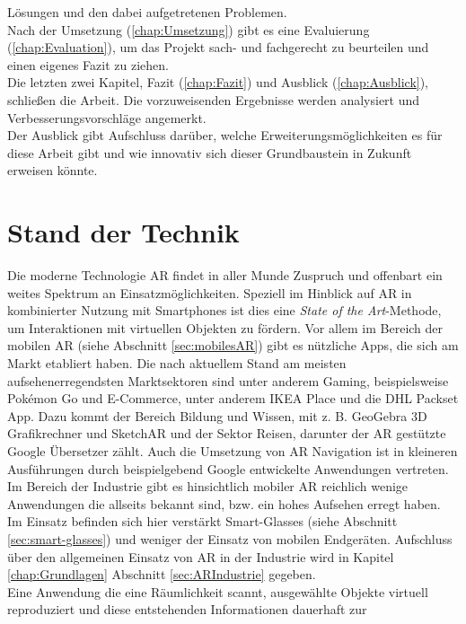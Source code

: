 Lösungen und den dabei aufgetretenen Problemen.
\\ 
Nach der Umsetzung (\ref{chap:Umsetzung}) gibt es eine Evaluierung (\ref{chap:Evaluation}), um das Projekt sach- und fachgerecht zu beurteilen 
und einen eigenes Fazit zu ziehen.
\\ 
Die letzten zwei Kapitel, Fazit (\ref{chap:Fazit}) und Ausblick (\ref{chap:Ausblick}), %
schließen die Arbeit. Die vorzuweisenden Ergebnisse werden analysiert und Verbesserungsvorschläge angemerkt.
\\ 
Der Ausblick gibt Aufschluss darüber, welche Erweiterungsmöglichkeiten es für diese Arbeit gibt und wie innovativ sich dieser 
Grundbaustein in Zukunft erweisen könnte. 
\section{Stand der Technik}
\label{chap:Stand der Technik}
Die moderne Technologie \acl{AR} findet in aller Munde Zuspruch und offenbart ein weites Spektrum an Einsatzmöglichkeiten. 
Speziell im Hinblick auf \acl{AR} in kombinierter Nutzung mit Smartphones ist dies eine \textit{State of the Art}-Methode, 
um Interaktionen mit virtuellen Objekten zu fördern. Vor allem im Bereich der mobilen \acs{AR} (siehe Abschnitt \ref{sec:mobilesAR}) 
gibt es nützliche Apps, die sich am Markt etabliert haben. Die nach aktuellem Stand am meisten aufsehenerregendsten Marktsektoren sind unter anderem 
Gaming, beispielsweise Pokémon Go und E-Commerce, unter anderem IKEA Place und die DHL Packset App. Dazu kommt der Bereich Bildung und Wissen, mit z. B. GeoGebra 3D 
Grafikrechner und SketchAR und der Sektor Reisen, darunter der \acs{AR} gestützte Google Übersetzer zählt. Auch die Umsetzung von \acl{AR} 
Navigation ist in kleineren Ausführungen durch beispielgebend Google entwickelte Anwendungen vertreten. %
\\ 
Im Bereich der Industrie gibt es hinsichtlich mobiler \acs{AR} 
reichlich wenige Anwendungen die allseits bekannt sind, bzw. ein hohes Aufsehen erregt haben. Im Einsatz befinden sich hier verstärkt Smart-Glasses (siehe Abschnitt 
\ref{sec:smart-glasses}) und weniger der Einsatz von mobilen Endgeräten. Aufschluss über den allgemeinen Einsatz von \acs{AR} in der Industrie wird in Kapitel 
\ref{chap:Grundlagen} Abschnitt \ref{sec:ARIndustrie} gegeben. 
\\ 
\linebreak
Eine Anwendung die eine Räumlichkeit scannt, ausgewählte Objekte virtuell reproduziert und diese entstehenden Informationen dauerhaft zur 
